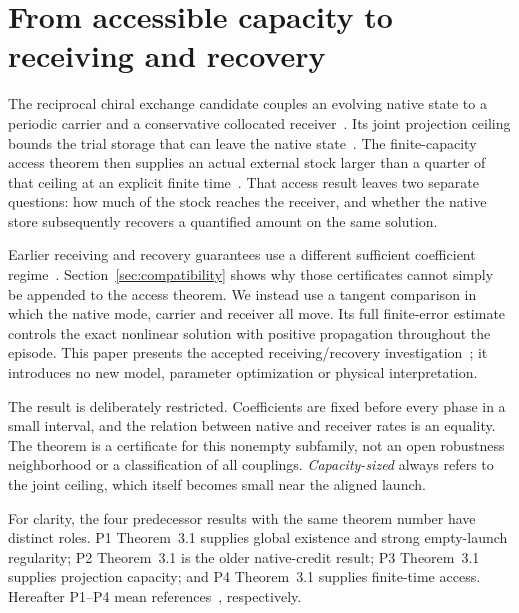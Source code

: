 \section{From accessible capacity to receiving and recovery}\label{sec:introduction}
The reciprocal chiral exchange candidate couples an evolving native state to a periodic carrier and a conservative collocated receiver~\cite{p1}. Its joint projection ceiling bounds the trial storage that can leave the native state~\cite{p3}. The finite-capacity access theorem then supplies an actual external stock larger than a quarter of that ceiling at an explicit finite time~\cite{p4}. That access result leaves two separate questions: how much of the stock reaches the receiver, and whether the native store subsequently recovers a quantified amount on the same solution.

Earlier receiving and recovery guarantees use a different sufficient coefficient regime~\cite{p2,p3}. Section~\ref{sec:compatibility} shows why those certificates cannot simply be appended to the access theorem. We instead use a tangent comparison in which the native mode, carrier and receiver all move. Its full finite-error estimate controls the exact nonlinear solution with positive propagation throughout the episode. This paper presents the accepted receiving/recovery investigation~\cite{investigation,review}; it introduces no new model, parameter optimization or physical interpretation.

The result is deliberately restricted. Coefficients are fixed before every phase in a small interval, and the relation between native and receiver rates is an equality. The theorem is a certificate for this nonempty subfamily, not an open robustness neighborhood or a classification of all couplings. \emph{Capacity-sized} always refers to the joint ceiling, which itself becomes small near the aligned launch.

For clarity, the four predecessor results with the same theorem number have distinct roles. P1 Theorem~3.1 supplies global existence and strong empty-launch regularity; P2 Theorem~3.1 is the older native-credit result; P3 Theorem~3.1 supplies projection capacity; and P4 Theorem~3.1 supplies finite-time access. Hereafter P1--P4 mean references~\cite{p1,p2,p3,p4}, respectively.
